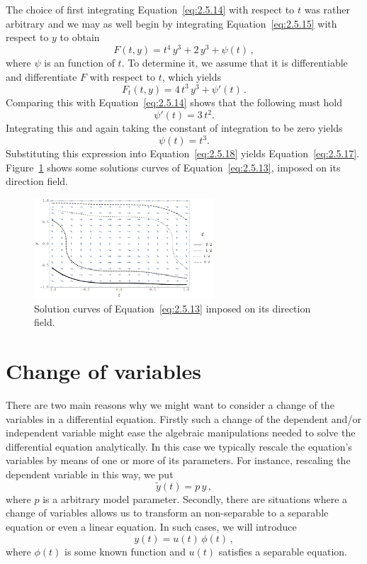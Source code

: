 \begin{example}
The choice of first integrating Equation~\eqref{eq:2.5.14} with respect to $t$ was rather arbitrary and we may as well begin by integrating Equation~\eqref{eq:2.5.15} with respect to $y$ to obtain
\begin{equation} \label{eq:2.5.18}
F(t,y)=t^4\,y^3+2\,y^3+\psi (t)\,,
\end{equation}
 where $\psi$ is an function of $t$.  To determine it, we assume that it is differentiable and differentiate $F$ with respect to $t$,
which yields
$$
F_t(t,y)=4\,t^3\,y^3+\psi'(t)\,.
$$
 Comparing this with Equation~\eqref{eq:2.5.14} shows that the following must hold
$$
\psi'(t)=3\,t^2.
$$
Integrating this and again taking  the constant of integration to be zero yields
$$
\psi(t)=t^3.
$$
 Substituting this expression into Equation~\eqref{eq:2.5.18} yields Equation~\eqref{eq:2.5.17}. Figure~\ref{exexact} shows some solutions curves of Equation~\eqref{eq:2.5.13}, imposed on its direction field. 


\begin{figure}[H]
	\begin{center}
			\includegraphics[width=0.6\textwidth]{exexact}
	\caption{Solution curves of Equation~\eqref{eq:2.5.13} imposed on its direction field.}
	\label{exexact}
	\end{center}
\end{figure}


\end{example}


\section{Change of variables}
There are two main reasons why we might want to consider a change of the variables in a differential equation. Firstly such a change of the dependent and/or independent variable might ease the algebraic manipulations needed to solve the differential equation analytically. In this case we typically rescale the equation's variables by means of one or more of its parameters. For instance, rescaling the dependent variable in this way, we put
$$
\tilde{y}(t)=p\,y\,,
$$
where $p$ is a arbitrary model parameter. Secondly, there are situations where a change of variables allows us to transform an non-separable to a separable equation or even a linear equation. In such cases, we will introduce
$$
y(t)=u(t)\,\phi(t)\,,
$$
where $\phi(t)$ is some known function and $u(t)$ satisfies a separable equation. 

